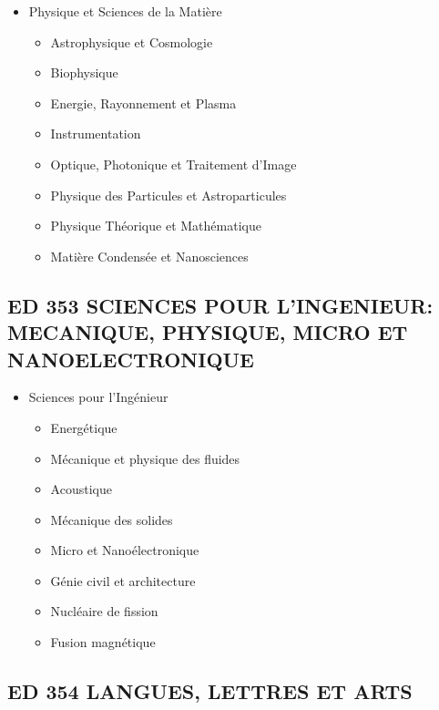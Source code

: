 		\begin{itemize}
		\item Physique et Sciences de la Matière 
			\begin{itemize}
			\item Astrophysique et Cosmologie
			\item Biophysique
			\item Energie, Rayonnement et Plasma
			\item Instrumentation
			\item Optique, Photonique et Traitement d'Image
			\item Physique des Particules et Astroparticules
			\item Physique Théorique et Mathématique
			\item Matière Condensée et Nanosciences 
			\end{itemize}
		\end{itemize}

	\subsection*{ED 353 SCIENCES POUR L'INGENIEUR: MECANIQUE, PHYSIQUE, MICRO ET NANOELECTRONIQUE}\label{ed-353-sciences-pour-lingenieur-mecanique-physique-micro-et-nanoelectronique}

		\begin{itemize}
		\item Sciences pour l'Ingénieur
			\begin{itemize}
			\item Energétique
			\item Mécanique et physique des fluides 
			\item Acoustique
			\item Mécanique des solides
			\item Micro et Nanoélectronique
			\item Génie civil et architecture
			\item Nucléaire de fission 
			\item Fusion magnétique
			\end{itemize}
		\end{itemize}

	\subsection*{ED 354 LANGUES, LETTRES ET ARTS}\label{ed-354-langues-lettres-et-arts}

